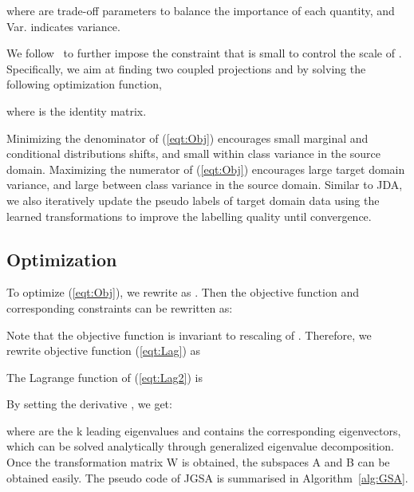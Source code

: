 \documentclass[10pt,twocolumn,letterpaper]{article}
\begin{document}
\begin{footnotesize}

\end{footnotesize}
where  are trade-off parameters to balance the importance of each quantity, and Var. indicates variance.

We follow~\cite{Ghifary2016} to further impose the constraint that  is small to control the scale of . Specifically, we aim at finding two coupled projections  and  by solving the following optimization function,

\begin{footnotesize}

\end{footnotesize}
where  is the identity matrix.

Minimizing the denominator of (\ref{eqt:Obj}) encourages small marginal and conditional distributions shifts, and small within class variance in the source domain. Maximizing the numerator of (\ref{eqt:Obj}) encourages large target domain variance, and large between class variance in the source domain. Similar to JDA, we also iteratively update the pseudo labels of target domain data using the learned transformations to improve the labelling quality until convergence.
\subsection{Optimization}
To optimize (\ref{eqt:Obj}), we rewrite  as . Then the objective function and corresponding constraints can be rewritten as:
\begin{footnotesize}
 
\end{footnotesize}
Note that the objective function is invariant to rescaling of . Therefore, we rewrite objective function (\ref{eqt:Lag}) as 
\begin{footnotesize}
 

\end{footnotesize}
The Lagrange function of (\ref{eqt:Lag2}) is
\begin{footnotesize}

\end{footnotesize}
By setting the derivative , we get:
\begin{footnotesize}

\end{footnotesize}
where  are the k leading eigenvalues and  contains the corresponding eigenvectors, which can be solved analytically through generalized eigenvalue decomposition. Once the transformation matrix W is obtained, the subspaces A and B can be obtained easily. The pseudo code of JGSA is summarised in Algorithm~\ref{alg:GSA}.
\end{document}
